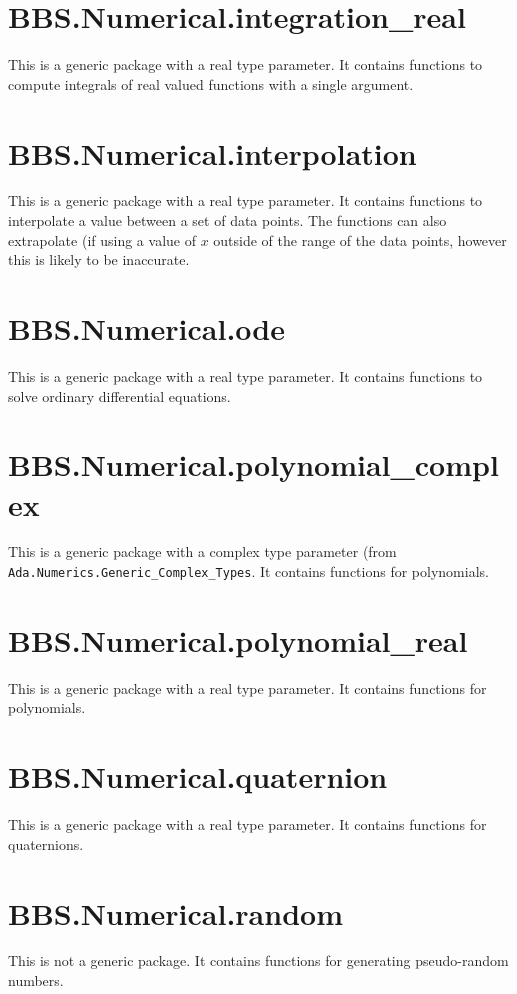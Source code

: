 \documentclass[10pt, openany]{book}
\newcommand{\package}[1]{\texttt{#1}}
\begin{document}
\section{BBS.Numerical.integration\_real}
This is a generic package with a real type parameter.  It contains functions to compute integrals of real valued functions with a single argument.

\section{BBS.Numerical.interpolation}
This is a generic package with a real type parameter.  It contains functions to interpolate a value between a set of data points.  The functions can also extrapolate (if using a value of $x$ outside of the range of the data points, however this is likely to be inaccurate.

\section{BBS.Numerical.ode}
This is a generic package with a real type parameter.  It contains functions to solve ordinary differential equations.

\section{BBS.Numerical.polynomial\_complex}
This is a generic package with a complex type parameter (from \package{Ada.Numerics.Generic\_Complex\_Types}.  It contains functions for polynomials.

\section{BBS.Numerical.polynomial\_real}
This is a generic package with a real type parameter.  It contains functions for polynomials.

\section{BBS.Numerical.quaternion}
This is a generic package with a real type parameter.  It contains functions for quaternions.

\section{BBS.Numerical.random}
This is not a generic package.  It contains functions for generating pseudo-random numbers.
\end{document}
